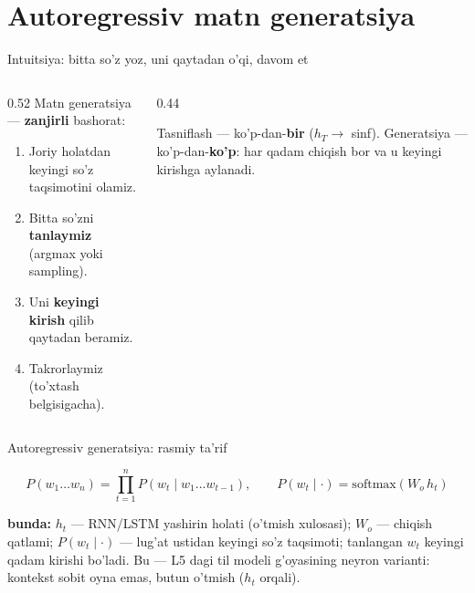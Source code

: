 \documentclass[aspectratio=169,11pt]{beamer}
\newcommand{\bunda}[1]{{\small\textbf{bunda:}\; #1}}
\begin{document}
\section[Generatsiya]{Autoregressiv matn generatsiya}

\begin{frame}{Intuitsiya: bitta so'z yoz, uni qaytadan o'qi, davom et}
  \begin{columns}[T]
    \begin{column}{0.52\textwidth}
      \small
      Matn generatsiya --- \textbf{zanjirli} bashorat:
      \begin{enumerate}\setlength\itemsep{1pt}
        \item Joriy holatdan keyingi so'z taqsimotini olamiz.
        \item Bitta so'zni \textbf{tanlaymiz} (argmax yoki sampling).
        \item Uni \textbf{keyingi kirish} qilib qaytadan beramiz.
        \item Takrorlaymiz (to'xtash belgisigacha).
      \end{enumerate}
    \end{column}
    \begin{column}{0.44\textwidth}
      \begin{tcolorbox}[okbox,top=2pt,bottom=2pt]
        \footnotesize
        Tasniflash --- ko'p-dan-\textbf{bir} ($h_T\to$ sinf). Generatsiya ---
        ko'p-dan-\textbf{ko'p}: har qadam chiqish bor va u keyingi kirishga aylanadi.
      \end{tcolorbox}
    \end{column}
  \end{columns}
\end{frame}

\begin{frame}{Autoregressiv generatsiya: rasmiy ta'rif}
  \begin{tcolorbox}[defbox,title=Ta'rif: zanjirli (autoregressiv) ehtimol]
    \vspace{-0.4em}
    $$ P(w_1 \ldots w_n) = \prod_{t=1}^{n} P(w_t \mid w_1 \ldots w_{t-1}),
       \qquad P(w_t \mid \cdot) = \mathrm{softmax}(W_o\,h_t) $$
  \end{tcolorbox}
  \vspace{2pt}
  \bunda{$h_t$ --- RNN/LSTM yashirin holati (o'tmish xulosasi); $W_o$ --- chiqish
  qatlami; $P(w_t\mid\cdot)$ --- lug'at ustidan keyingi so'z taqsimoti; tanlangan
  $w_t$ keyingi qadam kirishi bo'ladi.}
  \vspace{4pt}
  \footnotesize Bu --- L5 dagi til modeli g'oyasining neyron varianti: kontekst sobit
  oyna emas, butun o'tmish ($h_t$ orqali).
\end{frame}
\end{document}
